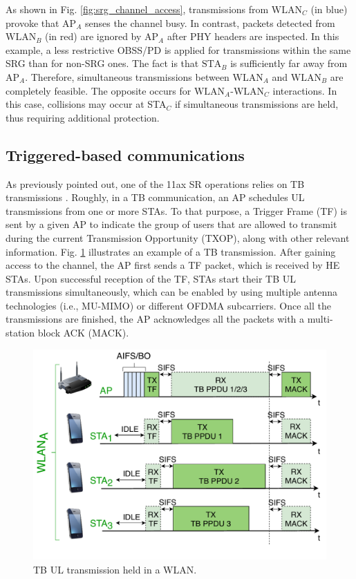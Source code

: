 \documentclass[comsoc]{IEEEtran}
\begin{document}
	As shown in Fig. \ref{fig:srg_channel_access}, transmissions from $\text{WLAN}_C$ (in blue) provoke that $\text{AP}_A$ senses the channel busy. In contrast, packets detected from $\text{WLAN}_B$ (in red) are ignored by $\text{AP}_A$ after PHY headers are inspected. In this example, a less restrictive OBSS/PD is applied for transmissions within the same SRG than for non-SRG ones. The fact is that $\text{STA}_B$ is sufficiently far away from $\text{AP}_A$. Therefore, simultaneous transmissions between $\text{WLAN}_A$ and $\text{WLAN}_B$ are completely feasible. The opposite occurs for $\text{WLAN}_A$-$\text{WLAN}_C$ interactions. In this case, collisions may occur at STA$_C$ if simultaneous transmissions are held, thus requiring additional protection.
	
	\subsection{Triggered-based communications}
	\label{section:tb_communication}
	As previously pointed out, one of the 11ax SR operations relies on TB transmissions \cite{bellalta2019ap}. Roughly, in a TB communication, an AP schedules UL transmissions from one or more STAs. To that purpose, a Trigger Frame (TF) is sent by a given AP to indicate the group of users that are allowed to transmit during the current Transmission Opportunity (TXOP), along with other relevant information. Fig. \ref{fig:TB_transmission_example} illustrates an example of a TB transmission. After gaining access to the channel, the AP first sends a TF packet, which is received by HE STAs. Upon successful reception of the TF, STAs start their TB UL transmissions simultaneously, which can be enabled by using multiple antenna technologies (i.e., MU-MIMO) or different OFDMA subcarriers. Once all the transmissions are finished, the AP acknowledges all the packets with a multi-station block ACK (MACK).
	\begin{figure}[ht!]
		\centering
		\includegraphics[width=\columnwidth]{fig_8}
		\caption{TB UL transmission held in a WLAN.}
		\label{fig:TB_transmission_example}
	\end{figure}
	
\end{document}
